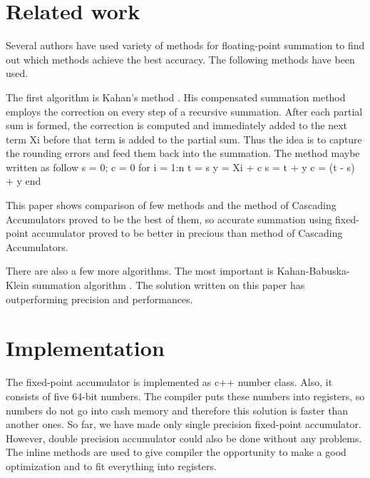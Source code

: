 \documentclass[conference]{IEEEtran}
\begin{document}
\section{Related work}
Several authors have used variety of methods for floating-point summation to find out which methods achieve the best accuracy. 
The following methods have been used. %
\par
The first algorithm is Kahan's method \cite{Kahan}. 
His compensated summation method employs the correction 
on every step of a recursive summation. After each partial 
sum is formed, the correction is computed and immediately added 
to the next term Xi before that term is added to the partial
sum. Thus the idea is to capture the rounding errors and feed 
them back into the summation. The method maybe written as follow
s = 0; c = 0 
for i = 1:n
	t = s
	y = Xi + c 
	s = t + y
	c = (t - s) + y
end
\par 
This paper shows comparison of few methods and the method of 
Cascading Accumulators \cite{ComparisonOfMethods, CascadingAccumulators}
proved to be the best of them, so accurate summation using
fixed-point accumulator proved to be better in precious 
than method of Cascading Accumulators.
\par
There are also a few more algorithms. 
The most important is Kahan-Babuska-Klein summation algorithm \cite{KahanBabuskaKlein}.
The solution written on this paper has outperforming precision and performances.

\section{Implementation}
The fixed-point accumulator is implemented as c++ number class.
Also, it consists of five 64-bit numbers. The compiler puts these 
numbers into registers, so numbers do not go into cash
memory and therefore this solution is faster than another ones.
So far, we have made only single precision fixed-point 
accumulator. However, double precision accumulator could also 
be done without any problems. The inline methods are used to give compiler
the opportunity to make a good optimization and to fit
everything into registers.
\end{document}
